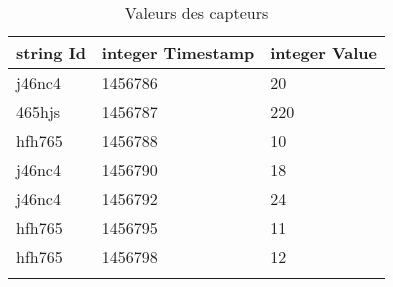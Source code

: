 \documentclass[10pt,a4paper]{article}
\begin{document}
\begin{table}[h!]
\centering
    \begin{tabular}{|l|l|l|}
    \hline
    \rowcolor[HTML]{EFEFEF} 
    string Id & integer Timestamp & integer Value \\ \hline
    j46nc4    & 1456786           & 20            \\ \hline
    465hjs    & 1456787           & 220           \\ \hline
    hfh765    & 1456788           & 10            \\ \hline
    j46nc4    & 1456790           & 18            \\ \hline
    j46nc4    & 1456792           & 24            \\ \hline
    hfh765    & 1456795           & 11            \\ \hline
    hfh765    & 1456798           & 12            \\ \hline
              &                   &              
    \end{tabular}
    \caption{Valeurs des capteurs}
\end{table}
\end{document}
